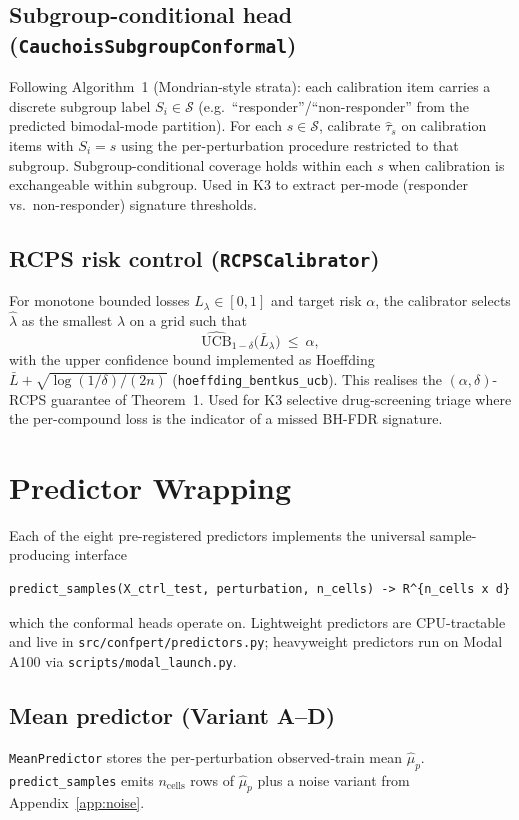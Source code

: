 \documentclass{article}
\begin{document}
\subsection{Subgroup-conditional head (\texttt{CauchoisSubgroupConformal})}
Following \citet{cauchois2021} Algorithm~1 (Mondrian-style strata): each calibration item carries a discrete subgroup label $S_i \in \mathcal{S}$ (e.g.\ ``responder''/``non-responder'' from the predicted bimodal-mode partition). For each $s \in \mathcal{S}$, calibrate $\hat{\tau}_s$ on calibration items with $S_i = s$ using the per-perturbation procedure restricted to that subgroup. Subgroup-conditional coverage holds within each $s$ when calibration is exchangeable within subgroup. Used in K3 to extract per-mode (responder vs.\ non-responder) signature thresholds.

\subsection{RCPS risk control (\texttt{RCPSCalibrator})}
For monotone bounded losses $L_\lambda \in [0, 1]$ and target risk $\alpha$, the calibrator selects $\hat{\lambda}$ as the smallest $\lambda$ on a grid such that
\begin{equation}
\widehat{\mathrm{UCB}}_{1-\delta}\bigl(\bar{L}_\lambda\bigr) \ \leq\ \alpha,
\end{equation}
with the upper confidence bound implemented as Hoeffding $\bar{L} + \sqrt{\log(1/\delta)/(2n)}$ (\texttt{hoeffding\_bentkus\_ucb}). This realises the $(\alpha, \delta)$-RCPS guarantee of \citet{bates2021} Theorem~1. Used for K3 selective drug-screening triage where the per-compound loss is the indicator of a missed BH-FDR signature.

\section{Predictor Wrapping}
\label{app:predictors}

Each of the eight pre-registered predictors implements the universal sample-producing interface
\begin{verbatim}
predict_samples(X_ctrl_test, perturbation, n_cells) -> R^{n_cells x d}
\end{verbatim}
which the conformal heads operate on. Lightweight predictors are CPU-tractable and live in \texttt{src/confpert/predictors.py}; heavyweight predictors run on Modal A100 via \texttt{scripts/modal\_launch.py}.

\subsection{Mean predictor (Variant A--D)}
\texttt{MeanPredictor} stores the per-perturbation observed-train mean $\hat{\mu}_p$. \texttt{predict\_samples} emits $n_{\text{cells}}$ rows of $\hat{\mu}_p$ plus a noise variant from Appendix~\ref{app:noise}.
\end{document}
